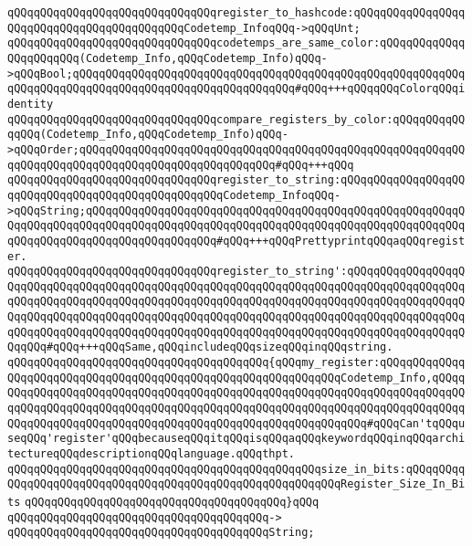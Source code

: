 \verb|qQQqqQQqqQQqqQQqqQQqqQQqqQQqqQQqregister_to_hashcode:qQQqqQQqqQQqqQQqqQQqqQQqqQQqqQQqqQQqqQQqqQQqCodetemp_InfoqQQq->qQQqUnt;|\newline
\verb|qQQqqQQqqQQqqQQqqQQqqQQqqQQqqQQqcodetemps_are_same_color:qQQqqQQqqQQqqQQqqQQqqQQq(Codetemp_Info,qQQqCodetemp_Info)qQQq->qQQqBool;qQQqqQQqqQQqqQQqqQQqqQQqqQQqqQQqqQQqqQQqqQQqqQQqqQQqqQQqqQQqqQQqqQQqqQQqqQQqqQQqqQQqqQQqqQQqqQQqqQQqqQQq#qQQq+++qQQqqQQqColorqQQqidentity|\newline
\verb|qQQqqQQqqQQqqQQqqQQqqQQqqQQqqQQqcompare_registers_by_color:qQQqqQQqqQQqqQQq(Codetemp_Info,qQQqCodetemp_Info)qQQq->qQQqOrder;qQQqqQQqqQQqqQQqqQQqqQQqqQQqqQQqqQQqqQQqqQQqqQQqqQQqqQQqqQQqqQQqqQQqqQQqqQQqqQQqqQQqqQQqqQQqqQQqqQQq#qQQq+++qQQq|\newline
\verb|qQQqqQQqqQQqqQQqqQQqqQQqqQQqqQQqregister_to_string:qQQqqQQqqQQqqQQqqQQqqQQqqQQqqQQqqQQqqQQqqQQqqQQqqQQqCodetemp_InfoqQQq->qQQqString;qQQqqQQqqQQqqQQqqQQqqQQqqQQqqQQqqQQqqQQqqQQqqQQqqQQqqQQqqQQqqQQqqQQqqQQqqQQqqQQqqQQqqQQqqQQqqQQqqQQqqQQqqQQqqQQqqQQqqQQqqQQqqQQqqQQqqQQqqQQqqQQqqQQqqQQqqQQqqQQq#qQQq+++qQQqPrettyprintqQQqaqQQqregister.|\newline
\verb|qQQqqQQqqQQqqQQqqQQqqQQqqQQqqQQqregister_to_string':qQQqqQQqqQQqqQQqqQQqqQQqqQQqqQQqqQQqqQQqqQQqqQQqqQQqqQQqqQQqqQQqqQQqqQQqqQQqqQQqqQQqqQQqqQQqqQQqqQQqqQQqqQQqqQQqqQQqqQQqqQQqqQQqqQQqqQQqqQQqqQQqqQQqqQQqqQQqqQQqqQQqqQQqqQQqqQQqqQQqqQQqqQQqqQQqqQQqqQQqqQQqqQQqqQQqqQQqqQQqqQQqqQQqqQQqqQQqqQQqqQQqqQQqqQQqqQQqqQQqqQQqqQQqqQQqqQQqqQQqqQQqqQQqqQQqqQQqqQQqqQQq#qQQq+++qQQqSame,qQQqincludeqQQqsizeqQQqinqQQqstring.|\newline
\verb|qQQqqQQqqQQqqQQqqQQqqQQqqQQqqQQqqQQqqQQq{qQQqmy_register:qQQqqQQqqQQqqQQqqQQqqQQqqQQqqQQqqQQqqQQqqQQqqQQqqQQqqQQqqQQqqQQqCodetemp_Info,qQQqqQQqqQQqqQQqqQQqqQQqqQQqqQQqqQQqqQQqqQQqqQQqqQQqqQQqqQQqqQQqqQQqqQQqqQQqqQQqqQQqqQQqqQQqqQQqqQQqqQQqqQQqqQQqqQQqqQQqqQQqqQQqqQQqqQQqqQQqqQQqqQQqqQQqqQQqqQQqqQQqqQQqqQQqqQQqqQQqqQQqqQQqqQQqqQQqqQQq#qQQqCan'tqQQquseqQQq'register'qQQqbecauseqQQqitqQQqisqQQqaqQQqkeywordqQQqinqQQqarchitectureqQQqdescriptionqQQqlanguage.qQQqthpt.|\newline
\verb|qQQqqQQqqQQqqQQqqQQqqQQqqQQqqQQqqQQqqQQqqQQqqQQqsize_in_bits:qQQqqQQqqQQqqQQqqQQqqQQqqQQqqQQqqQQqqQQqqQQqqQQqqQQqqQQqqQQqRegister_Size_In_Bits|\newline
\verb|qQQqqQQqqQQqqQQqqQQqqQQqqQQqqQQqqQQqqQQq}qQQq|\newline
\verb|qQQqqQQqqQQqqQQqqQQqqQQqqQQqqQQqqQQqqQQq->|\newline
\verb|qQQqqQQqqQQqqQQqqQQqqQQqqQQqqQQqqQQqqQQqString;|\newline
